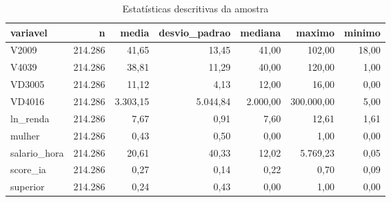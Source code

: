 \begin{table}

\caption{\label{tab:descritivas}Estatísticas descritivas da amostra}
\centering
\begin{tabular}[t]{lrrrrrr}
\toprule
variavel & n & media & desvio\_padrao & mediana & maximo & minimo\\
\midrule
V2009 & 214.286 & 41,65 & 13,45 & 41,00 & 102,00 & 18,00\\
V4039 & 214.286 & 38,81 & 11,29 & 40,00 & 120,00 & 1,00\\
VD3005 & 214.286 & 11,12 & 4,13 & 12,00 & 16,00 & 0,00\\
VD4016 & 214.286 & 3.303,15 & 5.044,84 & 2.000,00 & 300.000,00 & 5,00\\
ln\_renda & 214.286 & 7,67 & 0,91 & 7,60 & 12,61 & 1,61\\
\addlinespace
mulher & 214.286 & 0,43 & 0,50 & 0,00 & 1,00 & 0,00\\
salario\_hora & 214.286 & 20,61 & 40,33 & 12,02 & 5.769,23 & 0,05\\
score\_ia & 214.286 & 0,27 & 0,14 & 0,22 & 0,70 & 0,09\\
superior & 214.286 & 0,24 & 0,43 & 0,00 & 1,00 & 0,00\\
\bottomrule
\end{tabular}
\end{table}
